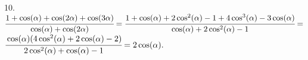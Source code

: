 10. $\cfrac{1+\cos(\alpha)+\cos(2\alpha)+\cos(3\alpha)}{\cos(\alpha)+\cos(2\alpha)}=
\cfrac{1+\cos(\alpha)+2\cos^2(\alpha)-1+4\cos^3(\alpha)-3\cos(\alpha)}{\cos(\alpha)+2\cos^2(\alpha)-1}=$\\$
\cfrac{\cos(\alpha)(4\cos^2(\alpha)+2\cos(\alpha)-2)}{2\cos^2(\alpha)+\cos(\alpha)-1}=2\cos(\alpha).$\\
